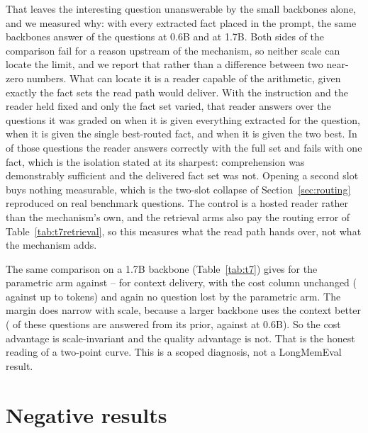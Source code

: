 \documentclass[11pt]{article}
\begin{document}
That leaves the interesting question unanswerable by the small backbones alone, and we
measured why: with every extracted fact placed in the prompt, the same backbones answer
\tMultiJudgeContext{} of the questions at 0.6B and \tMultiJudgeLargeContext{} at 1.7B. Both
sides of the comparison fail for a reason upstream of the mechanism, so neither scale can
locate the limit, and we report that rather than a difference between two near-zero numbers.
What can locate it is a reader capable of the arithmetic, given exactly the fact sets the
read path would deliver. With the instruction and the reader held fixed and only the fact set
varied, that reader answers \tHostedContext{} over the \tHostedGraded{} questions it was graded
on when it is given everything extracted for the question, \tHostedTopOne{} when it is given
the single best-routed fact, and \tHostedTopTwo{} when it is given the two best. In
\tHostedIsolated{} of those questions the reader answers correctly with the full set and fails
with one fact, which is the isolation stated at its sharpest: comprehension was demonstrably
sufficient and the delivered fact set was not. Opening a second slot buys nothing measurable,
which is the two-slot collapse of Section~\ref{sec:routing} reproduced on real benchmark
questions. The control is a hosted reader rather than the mechanism's own, and the retrieval
arms also pay the routing error of Table~\ref{tab:t7retrieval}, so this measures what the read
path hands over, not what the mechanism adds.

The same comparison on a 1.7B backbone (Table~\ref{tab:t7}) gives \tScaleWeights{} for
the parametric arm against \tScaleContextTarget{}--\tScaleContextAll{} for context
delivery, with the cost column unchanged (\tTokWeights{} against up to
\tScaleTokens{} tokens) and again no question lost by the parametric arm. The margin
does narrow with scale, because a larger backbone uses the context better
(\tScaleFrozen{} of these questions are answered from its prior, against
\tLongMemFrozen{} at 0.6B). So the cost advantage is scale-invariant and the quality advantage is not. That is the honest reading of a two-point curve. This is a
scoped diagnosis, not a LongMemEval result.

\section{Negative results}
\label{sec:negative}
\end{document}
